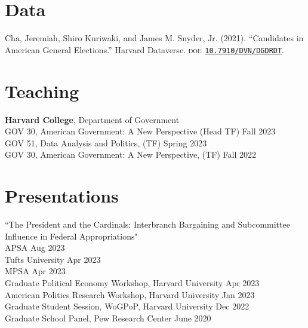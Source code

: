 \documentclass[margin, line]{res}
\begin{document}
\begin{resume}
\section{Data}
\begin{etaremune}
	\item Cha, Jeremiah, Shiro Kuriwaki, and James M. Snyder, Jr. (2021). ``Candidates in American General Elections.'' Harvard Dataverse. \textsc{doi}: \href{https://doi.org/10.7910/DVN/DGDRDT}{\texttt{10.7910/DVN/DGDRDT}}.
\end{etaremune}

\section{Teaching}
\textbf{Harvard College}, Department of Government\\
\hspace*{5mm} GOV 30, American Government: A New Perspective (Head TF) \hfill Fall 2023\\
\hspace*{5mm} GOV 51, Data Analysis and Politics, (TF) \hfill Spring 2023\\
\hspace*{5mm} GOV 30, American Government: A New Perspective,  (TF) \hfill Fall 2022

\section{Presentations}
``The President and the Cardinals: Interbranch Bargaining and Subcommittee Influence in Federal Appropriations"\\
\hspace*{5mm} APSA \hfill Aug 2023\\
\hspace*{5mm} Tufts University \hfill Apr 2023\\
\hspace*{5mm} MPSA \hfill Apr 2023\\
\hspace*{5mm} Graduate Political Economy Workshop, Harvard University \hfill Apr 2023\\
\hspace*{5mm} American Politics Research Workshop, Harvard University \hfill Jan 2023\\
\hspace*{5mm} Graduate Student Session, WoGPoP, Harvard University \hfill Dec 2022\\
Graduate School Panel, Pew Research Center  \hfill June 2020


\end{resume}
\end{document}
